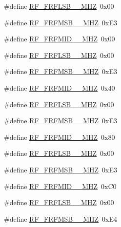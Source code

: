 \begin{DoxyCompactItemize}
\item 
\#define \mbox{\hyperlink{sx1276_regs-_fsk_8h_a69c1b7d68cd9e8efbd11af9bf2d23141}{R\+F\+\_\+\+F\+R\+F\+L\+S\+B\+\_\+\_\+\+M\+HZ}}~0x00
\item 
\#define \mbox{\hyperlink{sx1276_regs-_fsk_8h_a46d253ce6ced063cf1d1ac2790b6b655}{R\+F\+\_\+\+F\+R\+F\+M\+S\+B\+\_\+\_\+\+M\+HZ}}~0x\+E3
\item 
\#define \mbox{\hyperlink{sx1276_regs-_fsk_8h_a1113a7007b474ba7a126649cd5000ed7}{R\+F\+\_\+\+F\+R\+F\+M\+I\+D\+\_\+\_\+\+M\+HZ}}~0x00
\item 
\#define \mbox{\hyperlink{sx1276_regs-_fsk_8h_a3b906ff98326799d71d01c4d0439c349}{R\+F\+\_\+\+F\+R\+F\+L\+S\+B\+\_\+\_\+\+M\+HZ}}~0x00
\item 
\#define \mbox{\hyperlink{sx1276_regs-_fsk_8h_aa30208849f839f0bd46fa5bcce4a1b4d}{R\+F\+\_\+\+F\+R\+F\+M\+S\+B\+\_\+\_\+\+M\+HZ}}~0x\+E3
\item 
\#define \mbox{\hyperlink{sx1276_regs-_fsk_8h_a0f2dfb97900c562d6097dc14bed35164}{R\+F\+\_\+\+F\+R\+F\+M\+I\+D\+\_\+\_\+\+M\+HZ}}~0x40
\item 
\#define \mbox{\hyperlink{sx1276_regs-_fsk_8h_a7cae9ceaac8f2c67896fae0f48307539}{R\+F\+\_\+\+F\+R\+F\+L\+S\+B\+\_\+\_\+\+M\+HZ}}~0x00
\item 
\#define \mbox{\hyperlink{sx1276_regs-_fsk_8h_ab768211f38db9d1409de34ae1a4e07ae}{R\+F\+\_\+\+F\+R\+F\+M\+S\+B\+\_\+\_\+\+M\+HZ}}~0x\+E3
\item 
\#define \mbox{\hyperlink{sx1276_regs-_fsk_8h_a3602c77fb8c46ec1aa8c8bc23455181d}{R\+F\+\_\+\+F\+R\+F\+M\+I\+D\+\_\+\_\+\+M\+HZ}}~0x80
\item 
\#define \mbox{\hyperlink{sx1276_regs-_fsk_8h_a480899d8b9136ea63dc5382d206def71}{R\+F\+\_\+\+F\+R\+F\+L\+S\+B\+\_\+\_\+\+M\+HZ}}~0x00
\item 
\#define \mbox{\hyperlink{sx1276_regs-_fsk_8h_a7dca7fbccfb186de24ab3c46a1a2d70b}{R\+F\+\_\+\+F\+R\+F\+M\+S\+B\+\_\+\_\+\+M\+HZ}}~0x\+E3
\item 
\#define \mbox{\hyperlink{sx1276_regs-_fsk_8h_abbadaaee53f7f5a47b4d7e06efe12f5b}{R\+F\+\_\+\+F\+R\+F\+M\+I\+D\+\_\+\_\+\+M\+HZ}}~0x\+C0
\item 
\#define \mbox{\hyperlink{sx1276_regs-_fsk_8h_ab6ba47c7782eb528dc506a3af1c8792b}{R\+F\+\_\+\+F\+R\+F\+L\+S\+B\+\_\+\_\+\+M\+HZ}}~0x00
\item 
\#define \mbox{\hyperlink{sx1276_regs-_fsk_8h_a8a8c4525592e8d79144da83beaf3bda8}{R\+F\+\_\+\+F\+R\+F\+M\+S\+B\+\_\+\_\+\+M\+HZ}}~0x\+E4

\end{DoxyCompactItemize}
